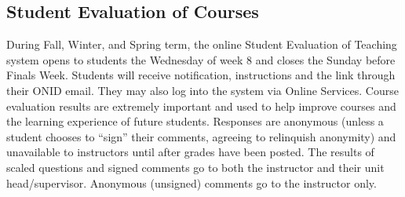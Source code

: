 \documentclass[10pt]{article}
\begin{document}
\subsection*{Student Evaluation of Courses}
During Fall, Winter, and Spring term, the online Student Evaluation of Teaching system opens to 
students the Wednesday of week 8 and closes the Sunday before Finals Week. 
Students will receive notification, instructions and the link through their ONID email. 
They may also log into the system via Online Services. 
Course evaluation results are extremely important and used to help improve courses and the learning 
experience of future students. 
Responses are anonymous (unless a student chooses to ``sign'' their comments, agreeing to relinquish 
anonymity) and unavailable to instructors until after grades have been posted. 
The results of scaled questions and signed comments go to both the instructor and their unit 
head/supervisor. 
Anonymous (unsigned) comments go to the instructor only.
\end{document}
